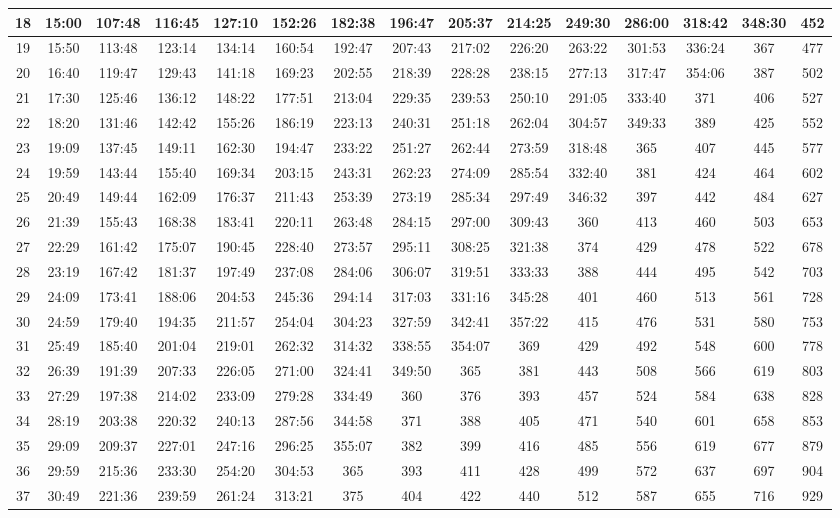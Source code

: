 \begin{footnotesize}
\begin{tabular}{c | c | c | c | c | c | c | c | c | c | c | c | c | c | c}
		18&15:00&107:48&116:45&127:10&152:26&182:38&196:47&205:37&214:25&249:30&286:00&318:42&348:30&452\\\hline
		19&15:50&113:48&123:14&134:14&160:54&192:47&207:43&217:02&226:20&263:22&301:53&336:24&367&477\\\hline
		20&16:40&119:47&129:43&141:18&169:23&202:55&218:39&228:28&238:15&277:13&317:47&354:06&387&502\\\hline
		21&17:30&125:46&136:12&148:22&177:51&213:04&229:35&239:53&250:10&291:05&333:40&371&406&527\\\hline
		22&18:20&131:46&142:42&155:26&186:19&223:13&240:31&251:18&262:04&304:57&349:33&389&425&552\\\hline
		23&19:09&137:45&149:11&162:30&194:47&233:22&251:27&262:44&273:59&318:48&365&407&445&577\\\hline
		24&19:59&143:44&155:40&169:34&203:15&243:31&262:23&274:09&285:54&332:40&381&424&464&602\\\hline
		25&20:49&149:44&162:09&176:37&211:43&253:39&273:19&285:34&297:49&346:32&397&442&484&627\\\hline
		26&21:39&155:43&168:38&183:41&220:11&263:48&284:15&297:00&309:43&360&413&460&503&653\\\hline
		27&22:29&161:42&175:07&190:45&228:40&273:57&295:11&308:25&321:38&374&429&478&522&678\\\hline
		28&23:19&167:42&181:37&197:49&237:08&284:06&306:07&319:51&333:33&388&444&495&542&703\\\hline
		29&24:09&173:41&188:06&204:53&245:36&294:14&317:03&331:16&345:28&401&460&513&561&728\\\hline
		30&24:59&179:40&194:35&211:57&254:04&304:23&327:59&342:41&357:22&415&476&531&580&753\\\hline
		31&25:49&185:40&201:04&219:01&262:32&314:32&338:55&354:07&369&429&492&548&600&778\\\hline
		32&26:39&191:39&207:33&226:05&271:00&324:41&349:50&365&381&443&508&566&619&803\\\hline
		33&27:29&197:38&214:02&233:09&279:28&334:49&360&376&393&457&524&584&638&828\\\hline
		34&28:19&203:38&220:32&240:13&287:56&344:58&371&388&405&471&540&601&658&853\\\hline
		35&29:09&209:37&227:01&247:16&296:25&355:07&382&399&416&485&556&619&677&879\\\hline
		36&29:59&215:36&233:30&254:20&304:53&365&393&411&428&499&572&637&697&904\\\hline
		37&30:49&221:36&239:59&261:24&313:21&375&404&422&440&512&587&655&716&929\\\hline

\end{tabular}
\end{footnotesize}
